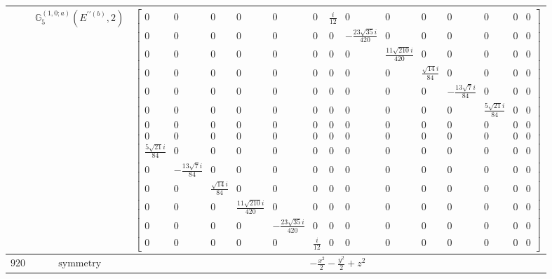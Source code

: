 \documentclass[fleqn,8pt,landscape]{jsarticle}
\begin{document}
\begin{longtable}{ccc}
$  $ & $ \mathbb{G}_{5}^{(1,0;a)}(E^{\prime\prime(b)},2) $ & $ \begin{bmatrix} 0 & 0 & 0 & 0 & 0 & 0 & \frac{i}{12} & 0 & 0 & 0 & 0 & 0 & 0 & 0 \\ 0 & 0 & 0 & 0 & 0 & 0 & 0 & - \frac{23 \sqrt{35} i}{420} & 0 & 0 & 0 & 0 & 0 & 0 \\ 0 & 0 & 0 & 0 & 0 & 0 & 0 & 0 & \frac{11 \sqrt{210} i}{420} & 0 & 0 & 0 & 0 & 0 \\ 0 & 0 & 0 & 0 & 0 & 0 & 0 & 0 & 0 & \frac{\sqrt{14} i}{84} & 0 & 0 & 0 & 0 \\ 0 & 0 & 0 & 0 & 0 & 0 & 0 & 0 & 0 & 0 & - \frac{13 \sqrt{7} i}{84} & 0 & 0 & 0 \\ 0 & 0 & 0 & 0 & 0 & 0 & 0 & 0 & 0 & 0 & 0 & \frac{5 \sqrt{21} i}{84} & 0 & 0 \\ 0 & 0 & 0 & 0 & 0 & 0 & 0 & 0 & 0 & 0 & 0 & 0 & 0 & 0 \\ 0 & 0 & 0 & 0 & 0 & 0 & 0 & 0 & 0 & 0 & 0 & 0 & 0 & 0 \\ \frac{5 \sqrt{21} i}{84} & 0 & 0 & 0 & 0 & 0 & 0 & 0 & 0 & 0 & 0 & 0 & 0 & 0 \\ 0 & - \frac{13 \sqrt{7} i}{84} & 0 & 0 & 0 & 0 & 0 & 0 & 0 & 0 & 0 & 0 & 0 & 0 \\ 0 & 0 & \frac{\sqrt{14} i}{84} & 0 & 0 & 0 & 0 & 0 & 0 & 0 & 0 & 0 & 0 & 0 \\ 0 & 0 & 0 & \frac{11 \sqrt{210} i}{420} & 0 & 0 & 0 & 0 & 0 & 0 & 0 & 0 & 0 & 0 \\ 0 & 0 & 0 & 0 & - \frac{23 \sqrt{35} i}{420} & 0 & 0 & 0 & 0 & 0 & 0 & 0 & 0 & 0 \\ 0 & 0 & 0 & 0 & 0 & \frac{i}{12} & 0 & 0 & 0 & 0 & 0 & 0 & 0 & 0 \end{bmatrix} $ \\ \hline
$ 920 $ & $ \text{symmetry} $ & $ - \frac{x^{2}}{2} - \frac{y^{2}}{2} + z^{2} $ \\

\end{longtable}
\end{document}
